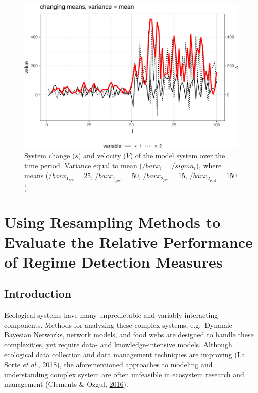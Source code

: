 \documentclass[12pt,twoside,openany]{reedthesis}
\begin{document}
\newpage
\begin{figure}
\includegraphics[width=0.85\linewidth]{_myDissertation_files/figure-latex/velocSysEx4-1} \caption{System change ($s$) and velocity ($V$) of the model system over the time period. Variance equal to mean ($/bar{x_i}=/sigma_i$), where means ($/bar{x}_{1_{pre}}=25$, $/bar{x}_{1_{post}}=50$, $/bar{x}_{2_{pre}}=15$, $/bar{x}_{2_{post}}=150$).}\label{fig:velocSysEx4}
\end{figure}
\hypertarget{resampling}{%
\chapter{Using Resampling Methods to Evaluate the Relative Performance of Regime Detection Measures}\label{resampling}}

\hypertarget{introduction-4}{%
\section{Introduction}\label{introduction-4}}

Ecological systems have many unpredictable and variably interacting components. Methods for analyzing these complex systems, e.g.~Dynamic Bayesian Networks, network models, and food webs are designed to handle these complexities, yet require data- and knowledge-intensive models. Although ecological data collection and data management techniques are improving (La Sorte \emph{et al.}, \protect\hyperlink{ref-lasorte2018opportunities}{2018}), the aforementioned approaches to modeling and understanding complex system are often unfeasible in ecosystem research and management (Clements \& Ozgul, \protect\hyperlink{ref-clements_including_2016}{2016}).
\end{document}
